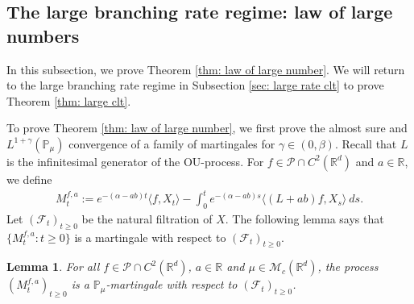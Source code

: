\documentclass[12pt,a4paper]{amsart}
\theoremstyle{plain}
\newtheorem{lem}[thm]{Lemma}
\theoremstyle{definition}
\numberwithin{equation}{section}
\begin{document}
\subsection{The large branching rate regime: law of large numbers}
\label{sec: large rate lln}

In this subsection, we prove Theorem \ref{thm: law of large number}.
We will return to the large branching rate regime in Subsection \ref{sec: large rate clt} to prove Theorem \ref{thm: large clt}.

To prove Theorem \ref{thm: law of large number}, we first prove the almost sure and $L^{1+\gamma}(\mathbb{P}_{\mu})$ convergence of a family of martingales for $\gamma\in (0, \beta)$. Recall that $L$ is the infinitesimal generator of the OU-process.  For $f\in \mathcal{P}\cap C^2(\mathbb R^d)$ and  $a\in \mathbb R$, we define
\begin{align}
  \label{defmartingale}
  M_t^{f,a}
  :=e^{-(\alpha-ab)t}\langle f,X_t\rangle-\int_0^t e^{-(\alpha-ab)s}\langle (L+ab)f, X_s\rangle~ ds.
\end{align}
Let $(\mathscr{F}_t)_{t\geq 0}$ be the natural filtration of $X$.  The following lemma says that $\{M_t^{f,a}: t\geq 0\}$ is a martingale with respect to $(\mathscr{F}_t)_{t\geq 0}$.
\begin{lem}
  \label{lemma25}
  For all $f\in \mathcal{P}\cap C^2(\mathbb R^d)$, $a\in \mathbb R$ and $\mu\in \mathcal M_c(\mathbb R^d)$, the process $(M_t^{f,a})_{t\geq 0}$ is a $\mathbb P_\mu$-martingale with respect to $(\mathscr F_t)_{t\geq 0}$.
\end{lem}
\end{document}
